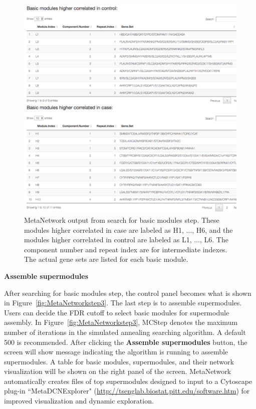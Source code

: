 \begin{steps}
\begin{figure}[H]
\begin{center}
\includegraphics[scale=0.9]{./figure/MetaNetwork/MetaNetworkBM.pdf}
\caption{MetaNetwork output from search for basic modules step.
These modules higher correlated in case are labeled as H1, $\ldots$, H6,
and the modules higher correlated in control are labeled as L1, $\ldots$, L6.
The component number and repeat index are for intermediate indexes.
The actual gene sets are listed for each basic module.
}
\label{fig:MetaNetworkBM}
\end{center}
\end{figure}

\item \textbf{Assemble supermodules}
\label{step:MetaDCN2}

After searching for basic modules step, 
the control panel becomes what is shown in Figure~\ref{fig:MetaNetworkstep3}. 
The last step is to assemble supermodules. 
Users can decide the FDR cutoff to select basic modules for supermodule assembly. 
In Figure~\ref{fig:MetaNetworkstep3}, 
MCStep denotes the maximum number of iterations in the simulated annealing searching algorithm. 
A default 500 is recommended. 
After clicking the \textbf{Assemble supermodules} button, 
the screen will show message indicating the algorithm is running to assemble supermodules.
A table for basic modules, supermodules, and their network visualization will be shown on the right panel of the screen.
MetaNetwork automatically creates files of top supermodules designed to input to a Cytoscape plug-in ``MetaDCNExplorer"
(\url{http://tsenglab.biostat.pitt.edu/software.htm}) for improved visualization and dynamic exploration.


\end{steps}
